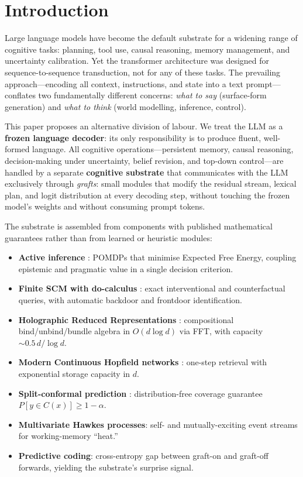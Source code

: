 
\section{Introduction}
\label{sec:introduction}

Large language models have become the default substrate for a widening range of
cognitive tasks: planning, tool use, causal reasoning, memory management, and
uncertainty calibration.  Yet the transformer architecture was designed for
sequence-to-sequence transduction, not for any of these tasks.  The prevailing
approach---encoding all context, instructions, and state into a text
prompt---conflates two fundamentally different concerns: \emph{what to say}
(surface-form generation) and \emph{what to think} (world modelling,
inference, control).

This paper proposes an alternative division of labour.  We treat the LLM as a
\textbf{frozen language decoder}: its only responsibility is to
produce fluent, well-formed language.  All cognitive operations---persistent
memory, causal reasoning, decision-making under uncertainty, belief revision,
and top-down control---are handled by a separate \textbf{cognitive substrate}
that communicates with the LLM exclusively through \emph{grafts}: small modules
that modify the residual stream, lexical plan, and logit distribution at every
decoding step, without touching the frozen model's weights and without
consuming prompt tokens.

The substrate is assembled from components with published mathematical
guarantees rather than from learned or heuristic modules:

\begin{itemize}[nosep]
  \item \textbf{Active inference} \cite{friston2010free}: POMDPs that minimise Expected Free
    Energy, coupling epistemic and pragmatic value in a single decision
    criterion.
  \item \textbf{Finite SCM with do-calculus} \cite{pearl2009causality}: exact interventional and
    counterfactual queries, with automatic backdoor and frontdoor
    identification.
  \item \textbf{Holographic Reduced Representations} \cite{plate1995hrr}: compositional
    bind/unbind/bundle algebra in $O(d \log d)$ via FFT, with capacity
    $\sim 0.5\,d / \log d$.
  \item \textbf{Modern Continuous Hopfield networks} \cite{Ramsauer2020}:
    one-step retrieval with exponential storage capacity in $d$.
  \item \textbf{Split-conformal prediction} \cite{vovk2005algorithmiclearning,romano2020classification}:
    distribution-free coverage guarantee $P[y \in C(x)] \geq 1 - \alpha$.
  \item \textbf{Multivariate Hawkes processes}: self- and mutually-exciting
    event streams for working-memory ``heat.''
  \item \textbf{Predictive coding}: cross-entropy gap between graft-on and
    graft-off forwards, yielding the substrate's surprise signal.
\end{itemize}

